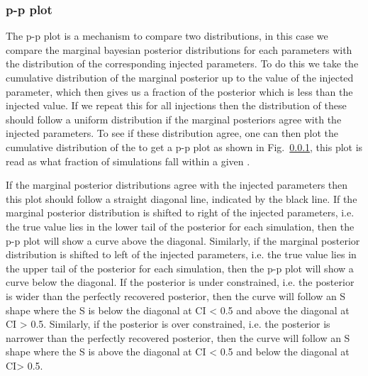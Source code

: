 \subsubsection{p-p plot}

The p-p plot is a mechanism to compare two distributions, in this case we compare the marginal bayesian posterior distributions for each parameters with the distribution of the corresponding injected parameters.
To do this we take the cumulative distribution of the marginal posterior up to the value of the injected parameter, which then gives us a fraction of the posterior which is less than the injected value.
If we repeat this for all injections then the distribution of these  should follow a uniform distribution if the marginal posteriors agree with the injected parameters.
To see if these distribution agree, one can then plot the cumulative distribution of the  to get a p-p plot as shown in Fig.~\ref{}, this plot is read as what fraction of simulations fall within a given .

If the marginal posterior distributions agree with the injected parameters then this plot should follow a straight diagonal line, indicated by the black line.
If the marginal posterior distribution is shifted to right of the injected parameters, i.e. the true value lies in the lower tail of the posterior for each simulation, then the p-p plot will show a curve above the diagonal. 
Similarly, if the marginal posterior distribution is shifted to left of the injected parameters, i.e. the true value lies in the upper tail of the posterior for each simulation, then the p-p plot will show a curve below the diagonal. 
If the posterior is under constrained, i.e. the posterior is wider than the perfectly recovered posterior, then the curve will follow an S shape where the S is below the diagonal at \gls{CI} < 0.5 and above the diagonal at \gls{CI} > 0.5.
Similarly, if the posterior is over constrained, i.e. the posterior is narrower than the perfectly recovered posterior, then the curve will follow an S shape where the S is above the diagonal at \gls{CI} < 0.5 and below the diagonal at \gls{CI}> 0.5.

